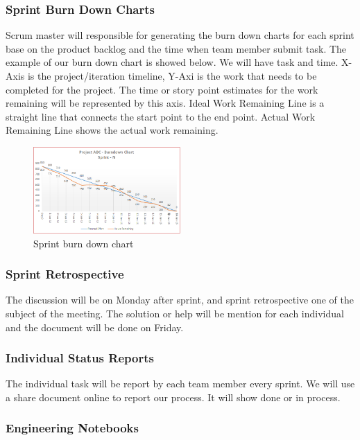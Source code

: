 \subsubsection{Sprint Burn Down Charts}

Scrum master will responsible for generating the burn down charts for each sprint base on the product backlog and the time when team member submit task. The example of our burn down chart is showed below. We will have task and time. X-Axis is the project/iteration timeline, Y-Axi is the work that needs to be completed for the project. The time or story point estimates for the work remaining will be represented by this axis. Ideal Work Remaining Line is a straight line that connects the start point to the end point. Actual Work Remaining Line shows the actual work remaining.

\begin{figure}[h!]
    \centering
    \includegraphics[width=0.5\textwidth]{images/burn_down_chart}
    \caption{Sprint burn down chart}
\end{figure}

\subsubsection{Sprint Retrospective}

The discussion will be on Monday after sprint, and sprint retrospective one of the subject of the meeting. The solution or help will be mention for each individual and the document will be done on Friday.


\subsubsection{Individual Status Reports}

The individual task will be report by each team member every sprint. We will use a share document online to report our process. It will show done or in process.
\subsubsection{Engineering Notebooks}
 
